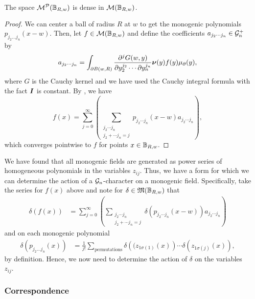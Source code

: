 \begin{lemma}
\label{lem:density}
The space $\mathcal{M}^\mathcal{P}(\mathbb{B}_{R,w})$ is dense in $\mathcal{M}(\mathbb{B}_{R,w})$.
\end{lemma}
\begin{proof}
We can center a ball of radius $R$ at $w$ to get the monogenic polynomials $p_{j_2 \dots j_n}(x-w)$. Then, let $f\in \mathcal{M}(\mathbb{B}_{R,w})$ and define the coefficients $a_{j_2 \cdots j_n}\in \mathcal{G}_n^+$ by
\begin{equation}
a_{j_2 \cdots j_n} = \int_{\partial B(w,R)} \frac{\partial^j G(w,y)}{\partial y_2^{j_2} \cdots \partial y_n^{j_n}} \boldsymbol{\nu}(y) f(y) \mu_\partial(y),
\end{equation}
where $G$ is the Cauchy kernel and we have used the Cauchy integral formula with the fact $\boldsymbol{I}$ is constant. By \cite[Theorem 4]{ryan_clifford_2004}, we have
\begin{equation}
        f(x) = \sum_{j=0}^\infty \left(\sum_{\substack{{j_2 \cdots j_n} \\ {j_2 + \cdots j_n = j}}} p_{j_2 \cdots j_n} (x-w) a_{j_2 \cdots j_n} \right),
\end{equation}
which converges pointwise to $f$ for points $x\in \mathbb{B}_{R,w}$.
\end{proof}

We have found that all monogenic fields are generated as power series of homogeneous polynomials in the variables $z_{ij}$. Thus, we have a form for which we can determine the action of a $\mathcal{G}_n$-character on a monogenic field. Specifically, take the series for $f(x)$ above and note for $\delta \in \mathfrak{M}(\mathbb{B}_{R,w})$ that
\begin{align}
\delta(f(x)) &= \sum_{j=0}^\infty \left(\sum_{\substack{{j_2 \cdots j_n} \\ {j_2 + \cdots j_n = j}}} \delta(p_{j_2 \cdots j_n} (x-w)) a_{j_2 \cdots j_n} \right)
\end{align}
and on each monogenic polynomial
\begin{align}
\delta(p_{j_2 \dots j_n}(x)) &= \frac{1}{j!} \sum_{\textrm{permutations}}\delta\left((z_{1\sigma(1)}(x)\right) \cdots \delta\left(z_{1\sigma(j)}(x)\right),
\end{align}
by definition. Hence, we now need to determine the action of $\delta$ on the variables $z_{ij}$.

\subsubsection{Correspondence}

